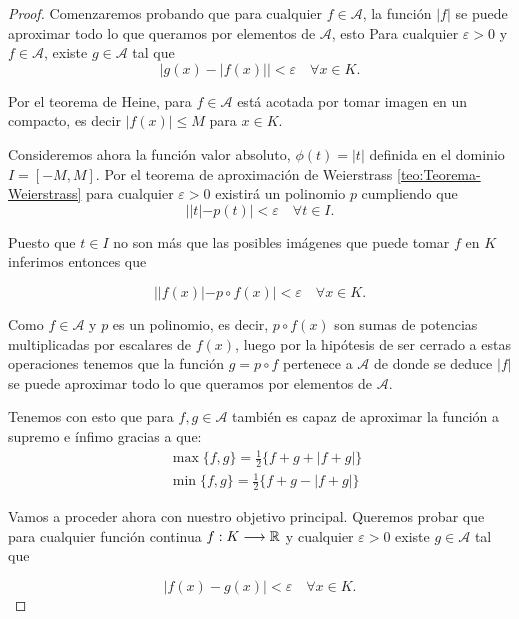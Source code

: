 \begin{proof}
    Comenzaremos probando que para cualquier  $f \in \mathcal{A}$, 
    la función $|f|$ se puede aproximar todo lo que queramos por elementos de $\mathcal{A}$, 
    esto 
    Para cualquier $\varepsilon > 0$ y $f \in \mathcal{A}$, 
    existe $g \in \mathcal{A}$  tal que 
    \begin{equation*}
        |g(x) - |f(x)|| < \varepsilon \quad \forall x \in K.
    \end{equation*}

     Por el teorema de Heine, para $f \in \mathcal A$ está acotada por tomar imagen en un compacto, es decir $|f(x)| \leq M$ para $x \in K.$  

    Consideremos ahora la función valor absoluto, $\phi(t)=|t|$ definida en el dominio $I = [-M, M].$
    Por el teorema de aproximación de Weierstrass 
    \ref{teo:Teorema-Weierstrass}
    para cualquier $\varepsilon > 0$ 
    existirá un polinomio $p$ cumpliendo que 
    $$||t|- p(t)| < \varepsilon \quad \forall t \in I.$$

    Puesto que $t \in I$ no son más que las posibles imágenes que puede tomar $f$ en $K$ inferimos entonces que 

    $$||f(x)| - p \circ f(x)| < \varepsilon \quad \forall x \in K.$$

    Como $f \in \mathcal{A}$ y $p$ es un polinomio, es decir, 
     $p \circ f(x)$ son sumas de potencias multiplicadas por escalares de $f(x)$, luego por la hipótesis de ser cerrado a estas operaciones tenemos que la función 
    $g = p \circ f$ pertenece a $\mathcal{A}$ de donde se deduce  
    $|f|$ se puede aproximar todo lo que queramos por elementos de $\mathcal{A}$. 

    Tenemos con esto que para $f,g \in \mathcal{A}$ también es capaz de aproximar la función
     a supremo e ínfimo  gracias a que:
    \begin{align} \label{eq:cerrado-min-max}
        & \max\{f,g\} = \frac{1}{2} \{f+g+ |f+g|\} \\
        & \min \{f,g\} = \frac{1}{2} \{f+g -|f+g|\}
    \end{align}   

 
    
    Vamos a proceder ahora con nuestro objetivo 
    principal. 
    Queremos probar que para cualquier función continua $f: K \longrightarrow \mathbb{R}$ y cualquier $\varepsilon > 0$ existe $g \in \mathcal{A}$ tal que 

    \begin{equation}
        |f(x) - g(x)| < \varepsilon \quad \forall  x \in K. 
    \end{equation}


\end{proof}
